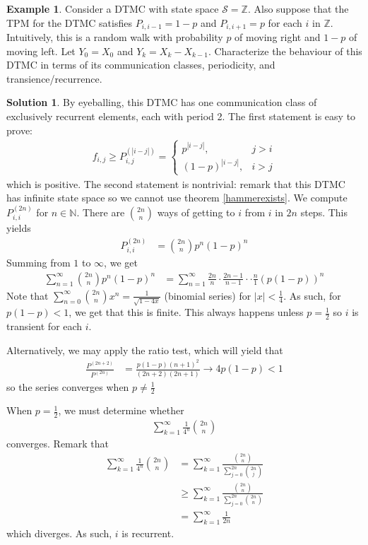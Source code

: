 \documentclass[11pt]{amsart}
\theoremstyle{definition}
\newtheorem{example}[theorem]{Example}
\newtheorem{solution}[theorem]{Solution}
\numberwithin{equation}{section}
\begin{document}
 \begin{example}
     Consider a DTMC with state space $\mathcal S=\mathbb Z$. Also suppose that the TPM for the DTMC satisfies $P_{i,i-1}=1-p$ and $P_{i,i+1}=p$ for each $i$ in $\mathbb Z$. Intuitively, this is a random walk with probability $p$ of moving right and $1-p$ of moving left. Let $Y_0=X_0$ and $Y_{k}=X_k-X_{k-1}$. Characterize the behaviour of this DTMC in terms of its communication classes, periodicity, and transience/recurrence.
 \end{example}
 \begin{solution}
     By eyeballing, this DTMC has one communication class of exclusively recurrent elements, each with period 2. The first statement is easy to prove: 
     \begin{align*}
         f_{i,j}\ge P_{i,j}^{(|i-j|)}=\begin{cases}
         p^{|i-j|}, & j>i\\
         (1-p)^{|i-j|}, & i>j
     \end{cases}
     \end{align*}
     which is positive. The second statement is nontrivial: remark that this DTMC has infinite state space so we cannot use theorem \ref{hammerexists}. We compute $P_{i,i}^{(2n)}$ for $n\in\mathbb N$. There are $\binom{2n}{n}$ ways of getting to $i$ from $i$ in $2n$ steps. This yields
     \begin{align*}
         P_{i,i}^{(2n)}&=\binom{2n}{n}p^n(1-p)^n
     \end{align*}
     Summing from $1$ to $\infty$, we get 
     \begin{align*}
         \sum_{n=1}^\infty \binom{2n}{n}p^n(1-p)^n&=\sum_{n=1}^\infty \frac{2n}{n}\cdot\frac{2n-1}{n-1}\cdot\cdot\frac{n}{1}(p(1-p))^n
     \end{align*}
     Note that $\sum_{n=0}^\infty \binom{2n}{n}x^n=\frac{1}{\sqrt{1-4x}}$ (binomial series) for $|x|<\frac{1}{4}$. As such, for $p(1-p)<1$, we get that this is finite. This always happens unless $p=\frac{1}{2}$ so $i$ is transient for each $i$.

     Alternatively, we may apply the ratio test, which will yield that 
     \begin{align*}
         \frac{P^{(2n+2)}}{P^{(2n)}}&=\frac{p(1-p)(n+1)^2}{(2n+2)(2n+1)}\to4p(1-p)<1
     \end{align*}
     so the series converges when $p\ne\frac{1}{2}$

     When $p=\frac{1}{2}$, we must determine whether 
     \begin{align*}
         \sum_{k=1}^\infty \frac{1}{4^n}\binom{2n}{n}
     \end{align*}
     converges. Remark that
     \begin{align*}
         \sum_{k=1}^\infty\frac{1}{4^n}\binom{2n}{n}&=\sum_{k=1}^\infty\frac{\binom{2n}{n}}{\sum_{j=0}^{2n}\binom{2n}{j}}\\
         &\ge\sum_{k=1}^\infty\frac{\binom{2n}{n}}{\sum_{j=0}^{2n}\binom{2n}{n}}\\
         &=\sum_{k=1}^\infty\frac{1}{2n}
     \end{align*}
     which diverges. As such, $i$ is recurrent.


\end{solution}
\end{document}
